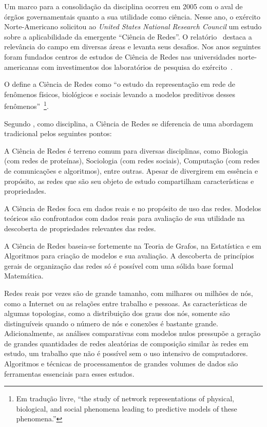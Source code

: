 \documentclass[12pt,a4paper]{article}
\begin{document}
Um marco para a consolidação da disciplina ocorreu em 2005 com o aval de órgãos governamentais quanto a sua utilidade como ciência. Nesse ano, o exército Norte-Americano solicitou ao \textit{United States National Research Council} um estudo sobre a aplicabilidade da emergente \enquote{Ciência de Redes}. O relatório~\cite{National_Research_Council2006-lv} destaca a relevância do campo em diversas áreas e levanta seus desafios. Nos anos seguintes foram fundados centros de estudos de Ciência de Redes nas universidades norte-americanas com investimentos dos laboratórios de pesquisa do exército~\cite{Maxwell2009-kq}.

O  define a Ciência de Redes como \enquote{o estudo da representação em rede de fenômenos físicos, biológicos e sociais levando a modelos preditivos desses fenômenos}~\footnote{Em tradução livre, \enquote{the study of network representations of physical, biological, and social phenomena leading to predictive models of these phenomena.}}.

Segundo , como disciplina, a Ciência de Redes se diferencia de uma abordagem tradicional pelos seguintes pontos:

\begin{description} \label{desc:ciencia-de-redes}
	\item[\textit{Interdisciplinar}.] A Ciência de Redes é terreno comum para diversas disciplinas, como Biologia (com redes de proteínas), Sociologia (com redes sociais), Computação (com redes de comunicações e algoritmos), entre outras. Apesar de divergirem em essência e propósito, as redes que são seu objeto de estudo compartilham características e propriedades.
    
    \item[\textit{Empírica}.] A Ciência de Redes foca em dados reais e no propósito de uso das redes. Modelos teóricos são confrontados com dados reais para avaliação de sua utilidade na descoberta de propriedades relevantes das redes.
    
    \item[\textit{Matemática e Quantitativa}.] A Ciência de Redes baseia-se fortemente na Teoria de Grafos, na Estatística e em Algoritmos para criação de modelos e sua avaliação. A descoberta de princípios gerais de organização das redes só é possível com uma sólida base formal Matemática.
    
    \item[\textit{Computacional}.] Redes reais por vezes são de grande tamanho, com milhares ou milhões de nós, como a Internet ou as relações entre trabalho e pessoas. As características de algumas topologias, como a distribuição dos graus dos nós, somente são distinguíveis quando o número de nós e conexões é bastante grande. Adicionalmente, as análises comparativas com modelos nulos pressupõe a geração de grandes quantidades de redes aleatórias de composição similar às redes em estudo, um trabalho que não é possível sem o uso intensivo de computadores. Algoritmos e técnicas de processamentos de grandes volumes de dados são ferramentas essenciais para esses estudos.
\end{description}
\end{document}
